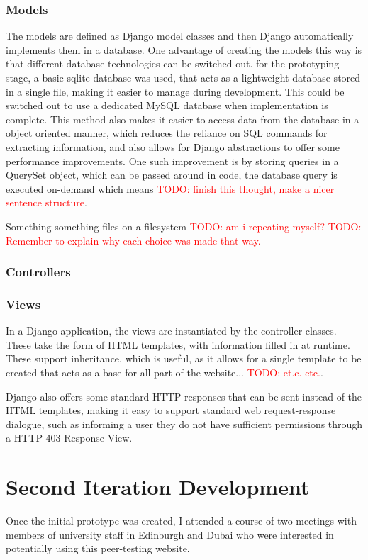 \documentclass[a4paper,11pt]{report}
\newcommand{\todo}[1]{\textcolor{red}{TODO: #1}}
\begin{document}
\subsection{Models}
The models are defined as Django model classes and then Django automatically implements them in a database. One advantage of creating the models this way is that different database technologies can be switched out. for the prototyping stage, a basic sqlite database was used, that acts as a lightweight database stored in a single file, making it easier to manage during development. This could be switched out to use a dedicated MySQL database when implementation is complete. This method also makes it easier to access data from the database in a object oriented manner, which reduces the reliance on SQL commands for extracting information, and also allows for Django abstractions to offer some performance improvements. One such improvement is by storing queries in a QuerySet object, which can be passed around in code, the database query is executed on-demand which means \todo{finish this thought, make a nicer sentence structure}.\par
Something something files on a filesystem \todo{am i repeating myself?}
\todo{Remember to explain why each choice was made that way.}
\subsection{Controllers}


\subsection{Views}
In a Django application, the views are instantiated by the controller classes. These take the form of HTML templates, with information filled in at runtime. These support inheritance, which is useful, as it allows for a single template to be created that acts as a base for all part of the website... \todo{et.c. etc.}.\par
Django also offers some standard HTTP responses that can be sent instead of the HTML templates, making it easy to support standard web request-response dialogue, such as informing a user they do not have sufficient permissions through a HTTP 403 Response View.


\chapter{Second Iteration Development}
Once the initial prototype was created, I attended a course of two meetings with members of university staff in Edinburgh and Dubai who were interested in potentially using this peer-testing website.\par
\end{document}
